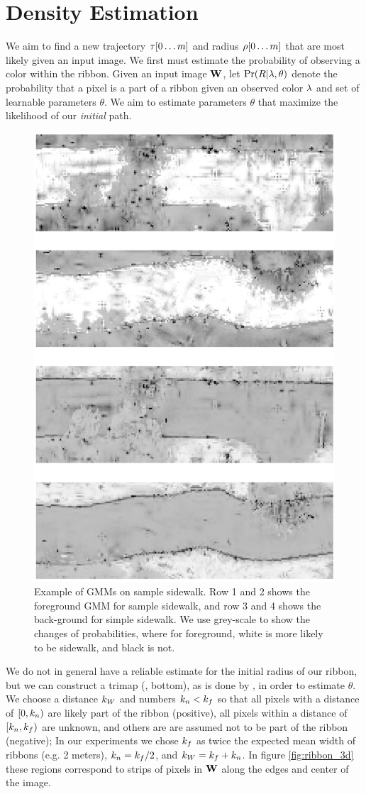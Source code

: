 \section{Density Estimation}\label{sec:density-estimation}
We aim to find a new trajectory $\tau{}[0\dots m]$ and radius $\rho{}[0\dots m]$ that are most likely given an input image. We first must estimate the probability of observing a color within the ribbon.  
Given an input image $\mathbf{W}{}$, let $\Pr(R|\lambda{},\theta)$ denote the probability that a pixel is a part of a ribbon given an observed color $\lambda{}$ and set of learnable parameters $\theta$. 
We aim to estimate parameters $\theta$ that maximize the likelihood of our \textit{initial} path. 

\begin{figure}[H]
    \centering
    \includegraphics[width=0.6\columnwidth]{Figures/GMM_sample6.png}
    \caption[\ac{GMM} Result 2]{Example of GMMs on sample sidewalk. Row 1 and 2 shows the foreground GMM for sample sidewalk, and row 3 and 4 shows the back-ground for simple sidewalk. We use grey-scale to show the changes of probabilities, where for foreground, white is more likely to be sidewalk, and black is not.}
    \label{fig:GMM_result_2}
\end{figure}

We do not in general have a reliable estimate for the initial radius of our ribbon, but we can construct a trimap (, bottom), as is done by \GrabCut{}, in order to estimate $\theta$. 
We choose a distance $k_W$ and numbers $k_n < k_f$ so that all pixels with a distance of $[0, k_n)$ are likely part of the ribbon (positive), all pixels within a distance of $[k_n, k_f)$ are unknown, and others are are assumed not to be part of the ribbon (negative);
In our experiments we chose  $k_f$ as twice the expected mean width of ribbons (e.g. 2 meters), $k_n = k_f/2$, and $k_W=k_f+k_n$.  
In figure \ref{fig:ribbon_3d} these regions correspond to strips of pixels in $\mathbf{W}{}$ along the edges and center of the image.

